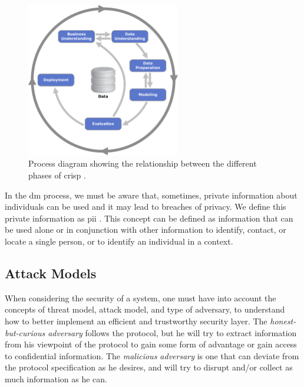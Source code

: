 \begin{figure}[!ht]
  \centering
  \includegraphics[width=0.60\textwidth]{images/CRISP-DM_Process_Diagram.png}
  \caption{Process diagram showing the relationship between the different phases of \acs{crisp} \cite{wirth2000crisp}.}
  \label{fig:crisp-dm}
\end{figure}



In the \ac{dm} process, we must be aware that, sometimes, private information about individuals can be used and it may lead to breaches of privacy. We define this private information as \ac{pii} \cite{schwartz2011pii}. This concept can be defined as information that can be used alone or in conjunction with other information to identify, contact, or locate a single person, or to identify an individual in a context.



\subsection{Attack Models}
\label{ssec:AttackModels}

When considering the security of a system, one must have into account the concepts of threat model, attack model, and type of adversary, to understand how to better implement an efficient and trustworthy security layer. The \textit{honest-but-curious adversary} follows the protocol, but he will try to extract information from his viewpoint of the protocol to gain some form of advantage or gain access to confidential information.
The \textit{malicious adversary} is one that can deviate from the protocol specification as he desires, and will try to disrupt and/or collect as much information as he can.

